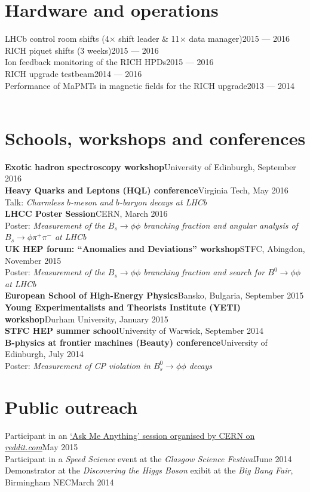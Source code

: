 \documentclass[contbibnum]{simplecv}
\newcommand\dateditem[2]{#1\hfill#2\\}
\newcommand\topictitle[3]{\dateditem{{\textbf{#1}}}{#3}#2}
\begin{document}
	\section{Hardware and operations}
	\dateditem{LHCb control room shifts (4$\times$ shift leader \& 11$\times$ data manager)}{2015 --- 2016}
	\dateditem{RICH piquet shifts (3 weeks)}{2015 --- 2016}
	\dateditem{Ion feedback monitoring of the RICH HPDs}{2015 --- 2016}
	\dateditem{RICH upgrade testbeam}{2014 --- 2016}
	\dateditem{Performance of MaPMTs in magnetic fields for the RICH upgrade}{2013 --- 2014}\\[-3em]
	\section{Schools, workshops and conferences}
	\topictitle{Exotic hadron spectroscopy workshop}{}{University of Edinburgh, September 2016}[0.5em]
	\topictitle{Heavy Quarks and Leptons (HQL) conference}{Talk: \textit{Charmless $b$-meson and $b$-baryon decays at LHCb}~\cite{HQL}}{Virginia Tech, May 2016}\\[0.5em]
	\topictitle{LHCC Poster Session}{Poster: \textit{Measurement of the $B_s \to \phi \phi$ branching fraction and angular analysis of $B_s \to \phi \pi^{+} \pi^{-}$ at LHCb}}{CERN, March 2016}\\[0.5em]
	\topictitle{UK HEP forum: ``Anomalies and Deviations'' workshop}{Poster: \textit{Measurement of the $B_s \to \phi \phi$ branching fraction and search for $B^0 \to \phi \phi$ at LHCb}}{STFC, Abingdon, November 2015}\\[0.5em]
	\topictitle{European School of High-Energy Physics}{}{Bansko, Bulgaria, September 2015}[0.5em]
	\topictitle{Young Experimentalists and Theorists Institute (YETI) workshop}{}{Durham University, January 2015}[0.5em]
	\topictitle{STFC HEP summer school}{}{University of Warwick, September 2014}[0.5em]
	\topictitle{B-physics at frontier machines (Beauty) conference}{Poster: \textit{Measurement of CP violation in $B^0_s \to \phi\phi$ decays}}{University of Edinburgh, July 2014}\\[-2em]
	\section{Public outreach}
	\dateditem{Participant in an \href{http://cds.cern.ch/record/2024978}{`Ask Me Anything' session organised by CERN on \textit{reddit.com}}}{May 2015}
	\dateditem{Participant in a \textit{Speed Science} event at the \textit{Glasgow Science Festival}}{June 2014}
	\dateditem{Demonstrator at the \textit{Discovering the Higgs Boson} exibit at the \textit{Big Bang Fair}, Birmingham NEC}{March 2014}\\[-3em]
\end{document}
